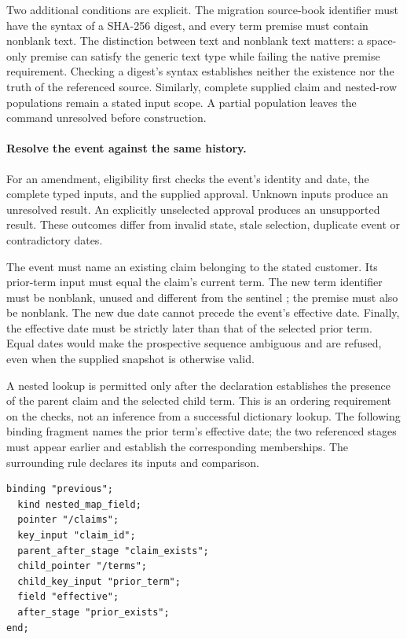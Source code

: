 Two additional conditions are explicit. The migration source-book identifier
must have the syntax of a SHA-256 digest, and every term premise must contain
nonblank text. The distinction between text and nonblank text matters: a
space-only premise can satisfy the generic text type while failing the native
premise requirement. Checking a digest's syntax establishes neither the
existence nor the truth of the referenced source. Similarly, complete supplied
claim and nested-row populations remain a stated input scope. A partial
population leaves the command unresolved before construction.

\paragraph{Resolve the event against the same history.}
For an amendment, eligibility first checks the event's identity and date, the
complete typed inputs, and the supplied approval. Unknown inputs produce an
unresolved result. An explicitly unselected approval produces an unsupported
result. These outcomes differ from invalid state, stale selection, duplicate
event or contradictory dates.

The event must name an existing claim belonging to the stated customer. Its
prior-term input must equal the claim's current term. The new term identifier
must be nonblank, unused and different from the sentinel ; the
premise must also be nonblank. The new due date cannot precede the event's
effective date. Finally, the effective date must be strictly later than that
of the selected prior term. Equal dates would make the prospective sequence
ambiguous and are refused, even when the supplied snapshot is otherwise valid.

A nested lookup is permitted only after the declaration establishes the
presence of the parent claim and the selected child term. This is an ordering
requirement on the checks, not an inference from a successful dictionary
lookup. The following binding fragment names the prior term's effective date;
the two referenced stages must appear earlier and establish the corresponding
memberships. The surrounding rule declares its inputs and comparison.

\begin{verbatim}
binding "previous";
  kind nested_map_field;
  pointer "/claims";
  key_input "claim_id";
  parent_after_stage "claim_exists";
  child_pointer "/terms";
  child_key_input "prior_term";
  field "effective";
  after_stage "prior_exists";
end;
\end{verbatim}

